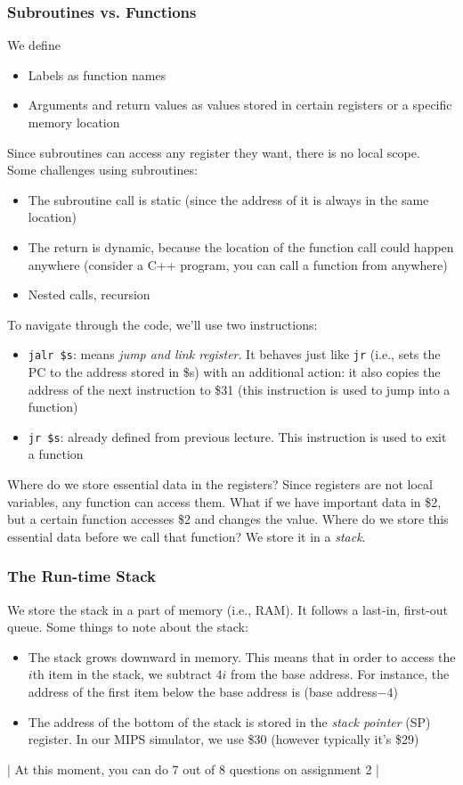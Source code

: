 \documentclass{report}
\begin{document}
\subsubsection{Subroutines vs. Functions}
We define
\begin{itemize}
\item Labels as function names
\item Arguments and return values as values stored in certain registers or a specific memory location
\end{itemize}
Since subroutines can access any register they want, there is no local scope.\\
Some challenges using subroutines:
\begin{itemize}
\item The subroutine call is static (since the address of it is always in the same location)
\item The return is dynamic, because the location of the function call could happen anywhere (consider a C++ program, you can call a function from anywhere)
\item Nested calls, recursion
\end{itemize}
To navigate through the code, we'll use two instructions:
\begin{itemize}
\item \texttt{jalr \$s}: means \textit{jump and link register}. It behaves just like \texttt{jr} (i.e., sets the PC to the address stored in \$s) with an additional action: it also copies the address of the next instruction to \$31 (this instruction is used to jump into a function)
\item \texttt{jr \$s}: already defined from previous lecture. This instruction is used to exit a function
\end{itemize}
Where do we store essential data in the registers? Since registers are not local variables, any function can access them. What if we have important data in \$2, but a certain function accesses \$2 and changes the value. Where do we store this essential data before we call that function? We store it in a \textit{stack}.
\subsubsection{The Run-time Stack}
We store the stack in a part of memory (i.e., RAM). It follows a last-in, first-out queue. Some things to note about the stack:
\begin{itemize}
\item The stack grows downward in memory. This means that in order to access the $i$th item in the stack, we subtract 4$i$ from the base address. For instance, the address of the first item below the base address is (base address$- 4$)
\item The address of the bottom of the stack is stored in the \textit{stack pointer} (SP) register. In our MIPS simulator, we use \$30 (however typically it's \$29)
\end{itemize}
\begin{center}
| At this moment, you can do 7 out of 8 questions on assignment 2 |
\end{center}
\end{document}
